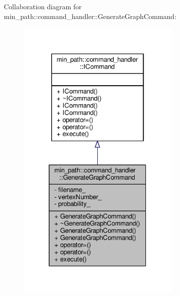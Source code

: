 Collaboration diagram for min\+\_\+path\+:\+:command\+\_\+handler\+:\+:Generate\+Graph\+Command\+:
\nopagebreak
\begin{figure}[H]
\begin{center}
\leavevmode
\includegraphics[width=229pt]{db/df8/a00076}
\end{center}
\end{figure}
